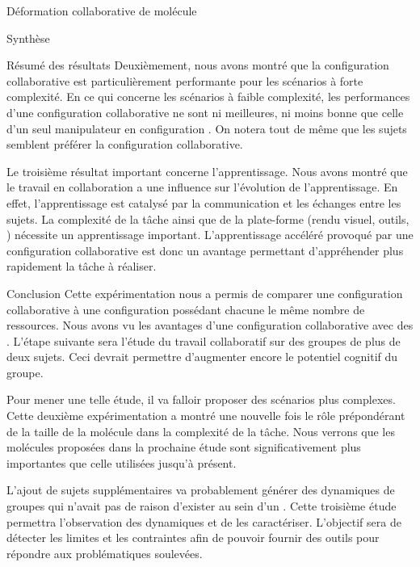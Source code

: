 \documentclass[myfrancais]{mythesis}
\begin{document}
\begin{mychapter}{Déformation collaborative de molécule}
\begin{mysection}{Synthèse}
\begin{mysubsection}{Résumé des résultats}
				Deuxièmement, nous avons montré que la configuration collaborative est particulièrement performante pour les scénarios à forte complexité.
				En ce qui concerne les scénarios à faible complexité, les performances d'une configuration collaborative ne sont ni meilleures, ni moins bonne que celle d'un seul manipulateur en configuration .
				On notera tout de même que les sujets semblent préférer la configuration collaborative.

				Le troisième résultat important concerne l'apprentissage.
				Nous avons montré que le travail en collaboration a une influence sur l'évolution de l'apprentissage.
				En effet, l'apprentissage est catalysé par la communication et les échanges entre les sujets.
				La complexité de la tâche ainsi que de la plate-forme (rendu visuel, outils, \myetc) nécessite un apprentissage important.
				L'apprentissage accéléré provoqué par une configuration collaborative est donc un avantage permettant d'appréhender plus rapidement la tâche à réaliser.
			\end{mysubsection}
			\begin{mysubsection}{Conclusion}
				Cette expérimentation nous a permis de comparer une configuration collaborative à une configuration  possédant chacune le même nombre de ressources.
				Nous avons vu les avantages d'une configuration collaborative avec des .
				L'étape suivante sera l'étude du travail collaboratif sur des groupes de plus de deux sujets.
				Ceci devrait permettre d'augmenter encore le potentiel cognitif du groupe.

				Pour mener une telle étude, il va falloir proposer des scénarios plus complexes.
				Cette deuxième expérimentation a montré une nouvelle fois le rôle prépondérant de la taille de la molécule dans la complexité de la tâche.
				Nous verrons que les molécules proposées dans la prochaine étude sont significativement plus importantes que celle utilisées jusqu'à présent.

				L'ajout de sujets supplémentaires va probablement générer des dynamiques de groupes qui n'avait pas de raison d'exister au sein d'un .
				Cette troisième étude permettra l'observation des dynamiques et de les caractériser.
				L'objectif sera de détecter les limites et les contraintes afin de pouvoir fournir des outils pour répondre aux problématiques soulevées.


\end{mysubsection}
\end{mysection}
\end{mychapter}
\end{document}
